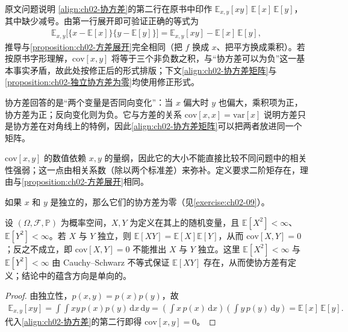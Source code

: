 \documentclass[../../main.tex]{subfiles}
\begin{document}
\begin{remark}原文问题说明
\eqref{align:ch02-协方差}的第二行在原书中印作 $\mathbb{E}_{x,y}[xy]\,\mathbb{E}[x]\,\mathbb{E}[y]$，其中缺少减号。由第一行展开即可验证正确的等式为
\begin{align*}
  \mathbb{E}_{x,y}\big[\{x-\mathbb{E}[x]\}\{y-\mathbb{E}[y]\}\big]
  = \mathbb{E}_{x,y}[xy] - \mathbb{E}[x]\,\mathbb{E}[y] ,
\end{align*}
推导与\cref{proposition:ch02-方差展开}完全相同（把 $f$ 换成 $x$、把平方换成乘积）。若按原书字形理解，$\mathrm{cov}[x,y]$ 将等于三个非负数之积，与“协方差可以为负”这一基本事实矛盾，故此处按修正后的形式排版；下文\eqref{align:ch02-协方差矩阵}与\cref{proposition:ch02-独立协方差为零}均使用修正形式。
\end{remark}

\begin{remark}
协方差回答的是“两个变量是否同向变化”：当 $x$ 偏大时 $y$ 也偏大，乘积项为正，协方差为正；反向变化则为负。它与方差的关系 $\mathrm{cov}[x,x]=\mathrm{var}[x]$ 说明方差只是协方差在对角线上的特例，因此\eqref{align:ch02-协方差矩阵}可以把两者放进同一个矩阵。

$\mathrm{cov}[x,y]$ 的数值依赖 $x,y$ 的量纲，因此它的大小不能直接比较不同问题中的相关性强弱；这一点由相关系数（除以两个标准差）来弥补。定义要求二阶矩存在，理由与\cref{proposition:ch02-方差展开}相同。
\end{remark}

如果 $x$ 和 $y$ 是独立的，那么它们的协方差为零（见\cref{exercise:ch02-09}）。

\begin{proposition}[独立变量的协方差为零]\label{proposition:ch02-独立协方差为零}
设 $(\Omega,\mathcal{F},\mathbb{P})$ 为概率空间，$X,Y$ 为定义在其上的随机变量，且 $\mathbb{E}[X^{2}]<\infty$、$\mathbb{E}[Y^{2}]<\infty$。若 $X$ 与 $Y$ 独立，则 $\mathbb{E}[XY]=\mathbb{E}[X]\mathbb{E}[Y]$，从而 $\mathrm{cov}[X,Y]=0$；反之不成立，即 $\mathrm{cov}[X,Y]=0$ 不能推出 $X$ 与 $Y$ 独立。这里 $\mathbb{E}[X^{2}]<\infty$ 与 $\mathbb{E}[Y^{2}]<\infty$ 由 Cauchy–Schwarz 不等式保证 $\mathbb{E}[XY]$ 存在，从而使协方差有定义；结论中的蕴含方向是单向的。
\end{proposition}

\begin{proof}
由独立性，$p(x,y)=p(x)p(y)$，故
\begin{align*}
 \mathbb{E}_{x,y}[xy] = \int\!\!\int xy\,p(x)p(y)\,\mathrm{d}x\,\mathrm{d}y
 = \left(\int x\,p(x)\,\mathrm{d}x\right)\left(\int y\,p(y)\,\mathrm{d}y\right) = \mathbb{E}[x]\,\mathbb{E}[y] .
\end{align*}
代入\eqref{align:ch02-协方差}的第二行即得 $\mathrm{cov}[x,y]=0$。
\end{proof}
\end{document}
